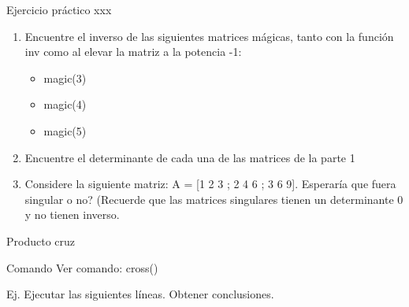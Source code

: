 \documentclass{bredelebeamer}
\begin{document}
\begin{frame}{Ejercicio práctico xxx}
\begin{enumerate}
\item Encuentre el inverso de las siguientes matrices mágicas, tanto con la función inv como al elevar la matriz a la potencia -1:
\begin{itemize}
\item magic(3)
\item magic(4)
\item magic(5)
\end{itemize}
\item Encuentre el determinante de cada una de las matrices de la parte 1
\item Considere la siguiente matriz: A = [1 2 3 ; 2 4 6 ; 3 6 9]. Esperaría que fuera singular o no? (Recuerde que las matrices singulares tienen un determinante 0 y no tienen inverso.
\end{enumerate}
\end{frame}

\begin{frame}{Producto cruz}
\begin{exampleblock}{Comando}
Ver comando: cross()
\end{exampleblock}
Ej. Ejecutar las siguientes líneas. Obtener conclusiones.
\end{frame}
\end{document}
